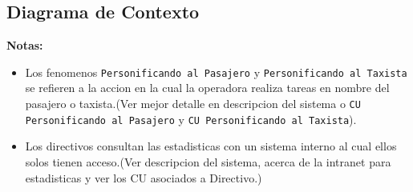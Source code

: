 \subsection{Diagrama de Contexto}
\textbf{Notas:}
\begin{itemize}
	\item Los fenomenos \texttt{Personificando al Pasajero} y \texttt{Personificando al Taxista} se refieren a la accion en la cual la operadora realiza tareas en nombre del pasajero o taxista.(Ver mejor detalle en descripcion del sistema o \texttt{CU Personificando al Pasajero} y \texttt{CU Personificando al Taxista}).
	\item{Los directivos consultan las estadisticas con un sistema interno al cual ellos solos tienen acceso.(Ver descripcion del sistema, acerca de la intranet para estadisticas y ver los CU asociados a Directivo.)}
\end{itemize}